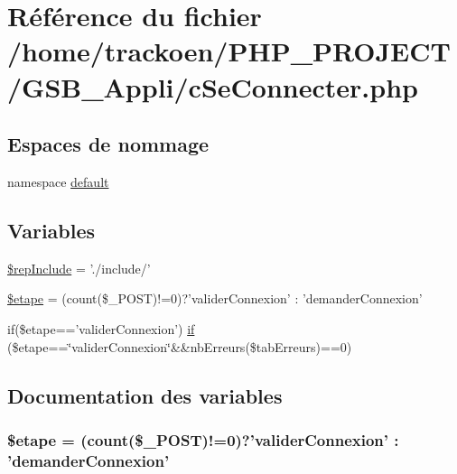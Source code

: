 \hypertarget{c_se_connecter_8php}{\section{Référence du fichier /home/trackoen/\-P\-H\-P\-\_\-\-P\-R\-O\-J\-E\-C\-T/\-G\-S\-B\-\_\-\-Appli/c\-Se\-Connecter.php}
\label{c_se_connecter_8php}
}
\subsection*{Espaces de nommage}
\begin{DoxyCompactItemize}
\item 
namespace \hyperlink{namespacedefault}{default}
\end{DoxyCompactItemize}
\subsection*{Variables}
\begin{DoxyCompactItemize}
\item 
\hyperlink{c_se_connecter_8php_aad2a80747c2de66b59cb18d493ae7a8b}{\$rep\-Include} = './include/'
\item 
\hyperlink{c_se_connecter_8php_a5c1bc42ba293d577d9e25d76e50f85ec}{\$etape} = (count(\$\-\_\-\-P\-O\-S\-T)!=0)?'valider\-Connexion' \-: 'demander\-Connexion'
\item 
if(\$etape=='valider\-Connexion') \hyperlink{c_se_connecter_8php_a161e098d41499c163a94c3fa5cd0e698}{if} (\$etape==\char`\"{}valider\-Connexion\char`\"{}\&\&nb\-Erreurs(\$tab\-Erreurs)==0)
\end{DoxyCompactItemize}


\subsection{Documentation des variables}
\hypertarget{c_se_connecter_8php_a5c1bc42ba293d577d9e25d76e50f85ec}{
\subsubsection[{\$etape}]{\setlength{\rightskip}{0pt plus 5cm}\$etape = (count(\$\-\_\-\-P\-O\-S\-T)!=0)?'valider\-Connexion' \-: 'demander\-Connexion'}}\label{c_se_connecter_8php_a5c1bc42ba293d577d9e25d76e50f85ec}


